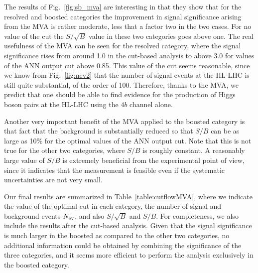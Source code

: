 The results of Fig.~\ref{fig:sb_mva} are interesting in that they show
that for the resolved and boosted categories the improvement in signal
significance arising from the MVA is rather moderate, less that a factor two
in the two cases.
%
For no value of the cut the $S/\sqrt{B}$ value in these two categories
goes above one.
%
The real usefulness of the MVA can be seen for the resolved category,
where the signal significance rises from around 1.0 in the cut-based
analysis to above 3.0 for values of the ANN output cut above 0.85.
%
This value of the cut seems reasonable, since we know from Fig.~\ref{fig:nev2}
that the number of signal events at the HL-LHC is still quite substantial,
of the order of 100.
%
Therefore, thanks to the MVA, we predict that one should be able
to find evidence for the production of Higgs boson pairs
at the HL-LHC using the $4b$ channel alone.

Another very important benefit of the MVA applied to the boosted
category is that fact that the background is substantially
reduced so that $S/B$ can be as large as 10\% for the optimal
values of the ANN output cut.
%
Note that this is not true for the other two categories,
where $S/B$ is roughly constant.
%
A reasonably large value of $S/B$ is extremely beneficial
from the experimental point of view, since it indicates
that the measurement is feasible even if the
systematic uncertainties are not very small.

Our final results are summarized in Table~\ref{table:cutflowMVA}, where we indicate
the value of the optimal cut in each category,
the number of signal and background events $N_{\rm ev}$,
and also $S/\sqrt{B}$ and $S/B$.
%
For completeness, we also include the results after the cut-based
analysis.
%
Given that the signal significance is much larger in the boosted as
compared to the other two categories, no additional information
could be obtained by combining the significance of the three
categories, and it seems more efficient to perform
the analysis exclusively in the boosted category.


